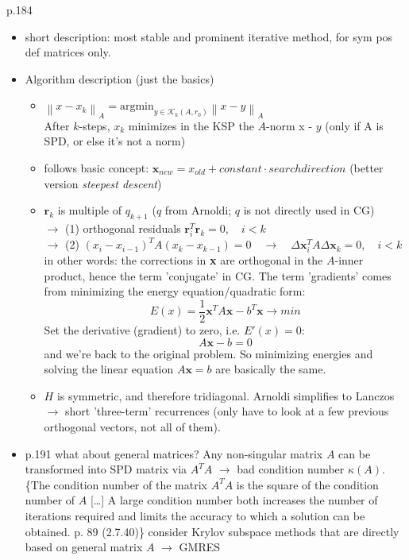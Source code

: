 \documentclass{scrartcl}
\newcommand{\norm}[1]{\left\lVert#1\right\rVert}
\begin{document}
\cite{Ascher:2011:FCN:2031413} p.184\\
\begin{itemize}
\item short description: most stable and prominent iterative method, for sym pos def matrices only.
\item Algorithm description (just the basics)
	\begin{itemize}
	\item $\norm{x - x_k}_A = \text{argmin}_{y \in \mathcal{K}_k(A, r_0)}\norm{x - y}_A$\\
	 After $k$-steps, $x_k$ minimizes in the KSP the $A$-norm x - $y$ (only if A is SPD, or else it's not a norm)
	\item follows basic concept: $\textbf{x}_{new} = x_{old} + constant \cdot search direction$ (better version \textit{steepest descent})
	\item $\textbf{r}_k$ is multiple of $q_{k+1}$ ($q$ from Arnoldi; $q$ is not directly used in CG)\\
	$\to$ (1) orthogonal residuals $\textbf{r}_i^T\textbf{r}_k = 0, \quad i < k$\\
	$\to$ (2) $(x_i - x_{i-1})^T A (x_k - x_{k-1}) = 0 \quad \to \quad\Delta \textbf{x}_i^T A \Delta \textbf{x}_k = 0, \quad  i < k$\\
	in other words: the corrections in \textbf{x} are orthogonal in the $A$-inner product, hence the term 'conjugate' in CG. The term 'gradients' comes from minimizing the energy equation/quadratic form:
	\begin{equation*}
	E(x) = \frac{1}{2} \textbf{x}^TA\textbf{x} - b^T\textbf{x} \to min
	\end{equation*}	 
	Set the derivative (gradient) to zero, i.e. $E'(x) = 0$:
	\begin{equation*}
	A\textbf{x} - b = 0
	\end{equation*}
	and we're back to the original problem. So minimizing energies and solving the linear equation $A\textbf{x} = b$ are basically the same.
	\item $H$ is symmetric, and therefore tridiagonal. Arnoldi simplifies to Lanczos $\to$ short 'three-term' recurrences (only have to look at a few previous orthogonal vectors, not all of them).
	\end{itemize}
\item p.191 what about general matrices? Any non-singular matrix $A$ can be transformed into SPD matrix via $A^TA$ $\to$ bad condition number $\kappa (A)$.\\

\{The condition number of the matrix $A^TA$ is the square of the condition number of $A$ [\ldots] A large condition number both increases the number of iterations required and limits the accuracy to which a solution can be obtained. \cite{press92a} p. 89 (2.7.40)\}
consider Krylov subspace methods that are directly based on general matrix $A$ $\to$ GMRES
\end{itemize}
\end{document}
